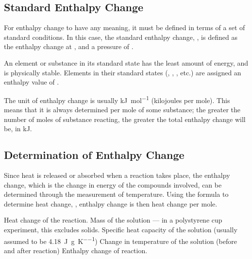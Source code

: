 
		\subsection{Standard Enthalpy Change}

			For enthalpy change to have any meaning, it must be defined in terms of a set of standard conditions. In this case, the standard
			enthalpy change, \enthStd{}, is defined as the enthalpy change at , and a pressure of .

			An element or substance in its standard state has the least amount of energy, and is physically stable. Elements in their standard
			states (, , , etc.) are assigned an enthalpy value of .

			The unit of enthalpy change is usually \si{\kilo\joule\per\mole} (kilojoules per mole). This means that it is always determined
			per mole of some substance; the greater the number of moles of substance reacting, the greater the total enthalpy change will be,
			in \si{\kilo\joule}.


		\subsection{Determination of Enthalpy Change}

			Since heat is released or absorbed when a reaction takes place, the enthalpy change, which is the change in energy of the compounds
			involved, can be determined through the measurement of temperature. Using the formula to determine heat change, , enthalpy change
			is then heat change per mole.

			\graphdiagram[1.75]{
				\parbox{50mm}{
					\vspace{-1em}
					\[q = mc\Delta T\]
					\[\Delta H = \pm\frac{q}{n}\]
				}
			}

			\vbox{
				\tabto{0mm}\tabto{15mm}	Heat change of the reaction.
				\tabto{0mm}\tabto{15mm}	Mass of the solution — in a polystyrene cup experiment, this excludes solids.
				\tabto{0mm}\tabto{15mm}	Specific heat capacity of the solution (usually assumed to be \SI{4.18}{\joule\per\gram\per\kelvin})
				\tabto{0mm}\tabto{15mm}Change in temperature of the solution (before and after reaction)
				\tabto{0mm}\tabto{15mm}Enthalpy change of reaction.
			}

